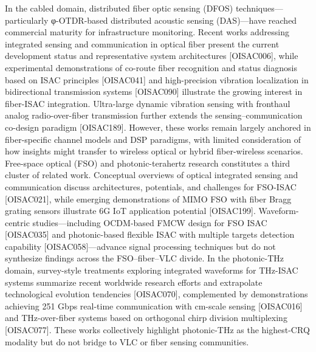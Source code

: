 {} In the cabled domain, distributed fiber optic sensing (DFOS) techniques—particularly φ-OTDR-based distributed acoustic sensing (DAS)—have reached commercial maturity for infrastructure monitoring. Recent works addressing integrated sensing and communication in optical fiber present the current development status and representative system architectures [O\markdownRendererUnderscore{}ISAC\markdownRendererUnderscore{}006], while experimental demonstrations of co-route fiber recognition and status diagnosis based on ISAC principles [O\markdownRendererUnderscore{}ISAC\markdownRendererUnderscore{}041] and high-precision vibration localization in bidirectional transmission systems [O\markdownRendererUnderscore{}ISAC\markdownRendererUnderscore{}090] illustrate the growing interest in fiber-ISAC integration. Ultra-large dynamic vibration sensing with fronthaul analog radio-over-fiber transmission further extends the sensing–communication co-design paradigm [O\markdownRendererUnderscore{}ISAC\markdownRendererUnderscore{}189]. However, these works remain largely anchored in fiber-specific channel models and DSP paradigms, with limited consideration of how insights might transfer to wireless optical or hybrid fiber-wireless scenarios.\markdownRendererParagraphSeparator
{} Free-space optical (FSO) and photonic-terahertz research constitutes a third cluster of related work. Conceptual overviews of optical integrated sensing and communication discuss architectures, potentials, and challenges for FSO-ISAC [O\markdownRendererUnderscore{}ISAC\markdownRendererUnderscore{}021], while emerging demonstrations of MIMO FSO with fiber Bragg grating sensors illustrate 6G IoT application potential [O\markdownRendererUnderscore{}ISAC\markdownRendererUnderscore{}199]. Waveform-centric studies—including OCDM-based FMCW design for FSO ISAC [O\markdownRendererUnderscore{}ISAC\markdownRendererUnderscore{}035] and photonic-based flexible ISAC with multiple targets detection capability [O\markdownRendererUnderscore{}ISAC\markdownRendererUnderscore{}058]—advance signal processing techniques but do not synthesize findings across the FSO–fiber–VLC divide. In the photonic-THz domain, survey-style treatments exploring integrated waveforms for THz-ISAC systems summarize recent worldwide research efforts and extrapolate technological evolution tendencies [O\markdownRendererUnderscore{}ISAC\markdownRendererUnderscore{}070], complemented by demonstrations achieving 251 Gbps real-time communication with cm-scale sensing [O\markdownRendererUnderscore{}ISAC\markdownRendererUnderscore{}016] and THz-over-fiber systems based on orthogonal chirp division multiplexing [O\markdownRendererUnderscore{}ISAC\markdownRendererUnderscore{}077]. These works collectively highlight photonic-THz as the highest-CRQ\markdownRendererInlineMath{_{\Delta}} modality but do not bridge to VLC or fiber sensing communities.\markdownRendererParagraphSeparator
